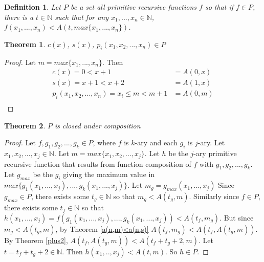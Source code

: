 \documentclass[12pt, letterpaper]{article}
\newtheorem{theorem}{Theorem}
\newtheorem*{definition}{Definition}
\theoremstyle{case}
\begin{document}
    \begin{definition}
      Let $P$ be a set all primitive recursive functions $f$ so that if $f \in P$, there is a $t \in \mathbb{N}$
      such that for any $x_1, ..., x_n \in \mathbb{N}$, $f(x_1, ..., x_n) < A(t, max\{x_1, ..., x_n\})$.
    \end{definition}

    \begin{theorem}
      $c(x)$, $s(x)$, $p_i(x_1, x_2, ..., x_n) \in P$
    \end{theorem}
    \begin{proof}
      Let $m = max\{x_1, ..., x_n\}$.
      Then
      \begin{equation*}
        \begin{aligned}
          c(x) = 0 < x + 1 &= A(0, x) \\
          s(x) = x + 1 < x + 2 &= A(1, x) \\
          p_i(x_1, x_2, ..., x_n) = x_i \leq m < m + 1 &= A(0, m) \\
        \end{aligned}
      \end{equation*}
    \end{proof}

    \begin{theorem}
      $P$ is closed under composition
    \end{theorem}
    \begin{proof}
      Let $f, g_1, g_2, ..., g_k \in P$, where $f$ is $k$-ary and each $g_i$ is $j$-ary.
      Let $x_1, x_2, ..., x_j \in \mathbb{N}$.
      Let $m = max\{x_1, x_2, ..., x_j\}$.
      Let $h$ be the $j$-ary primitive recursive function that results from function composition of $f$ with $g_1, g_2, ..., g_k$.
      Let $g_{max}$ be the $g_i$ giving the maximum value in $max\{g_1(x_1, ..., x_j), ..., g_k(x_1, ..., x_j)\}$.
      Let $m_g = g_{max}(x_1, ..., x_j)$
      Since $g_{max} \in P$, there exists some $t_g \in \mathbb{N}$ so that $m_g < A(t_g, m)$.
      Similarly since $f \in P$, there exists some $t_f \in \mathbb{N}$ so that $h(x_1, ..., x_j) = f(g_1(x_1, ..., x_j), ..., g_k(x_1, ..., x_j)) < A(t_f, m_g)$.
      But since $m_g < A(t_g, m)$, by Theorem \ref{a(n,m)<a(n,s)} $A(t_f, m_g) < A(t_f, A(t_g, m))$.
      By Theorem \ref{plus2}, $A(t_f, A(t_g, m)) < A(t_f + t_g + 2, m)$.
      Let $t = t_f + t_g + 2 \in \mathbb{N}$.
      Then $h(x_1, .., x_j) < A(t, m)$.
      So $h \in P$.
    \end{proof}
\end{document}
